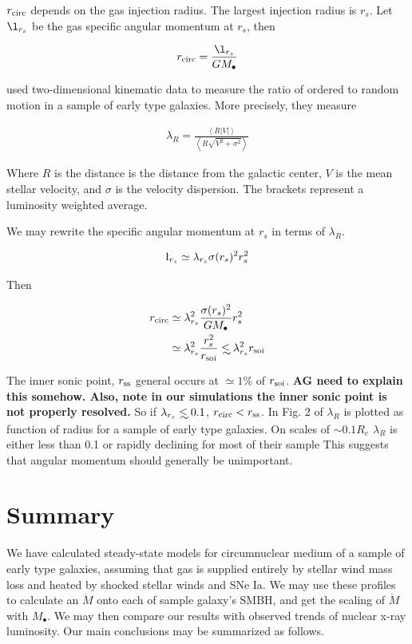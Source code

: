 \documentclass[usenatbib,fleqn]{mn2e}
\newcommand{\Mdot}{\dot{M}}
\newcommand\lsim{\mathrel{\rlap{\lower4pt\hbox{\hskip1pt$\sim$}}
    \raise1pt\hbox{$<$}}}
\newcommand{\rs}{r_s}
\newcommand{\rcirc}{r_{\rm circ}}
\newcommand{\rss}{r_{\rm ss}}
\newcommand{\lrs}{\l_{\rs}}
\newcommand{\lambdars}{\lambda_{\rs}}
\newcommand{\Mbh}[1][]{M_{\bullet#1}}
\newcommand{\soi}{\rm soi}
\newcommand{\rsoi}{r_{\soi}}
\begin{document}
  $\rcirc$ depends on the gas injection radius. The largest
  injection radius is $\rs$. Let $\lrs$ be the gas specific angular
  momentum at $\rs$, then 

  \begin{align}
    \rcirc=\frac{\lrs}{G \Mbh}
  \end{align}

  \citet{EmsellemCappellari+:2007a} used two-dimensional kinematic
  data to measure the ratio of ordered to random motion in a sample of
  early type galaxies. More precisely, they measure

  \begin{align}
    \lambda_R=\frac{\left<R|V|\right>}{\left<R\sqrt{V^2+\sigma^2}\right>}
  \end{align}

  Where $R$ is the distance is the distance from the galactic center, $V$ is
  the mean stellar velocity, and $\sigma$ is the velocity
  dispersion. The brackets represent a luminosity weighted average.

  We may rewrite the specific angular momentum at $\rs$ in terms of
  $\lambda_R$.

  \begin{align}
    \lrs\simeq\lambdars \sigma(\rs)^2 \rs^2
  \end{align}

  Then

  \begin{align}
    \rcirc&\simeq\lambdars^2 \frac{\sigma(\rs)^2}{G \Mbh} \rs^2\\
    &\simeq\lambdars^2 \frac{\rs^2}{\rsoi} \lsim \lambdars^2 \rsoi
  \end{align}

  The inner sonic point, $\rss$ general occurs at $\simeq 1\%$ of
  $\rsoi$. {\bf AG need to explain this somehow. Also, note in our
    simulations the inner sonic point is not properly resolved.}
  So if $\lambdars\lsim 0.1$, $\rcirc<\rss$. In Fig. 2 of
  \citet{EmsellemCappellari+:2007a} $\lambda_R$ is plotted as function
  of radius for a sample of early type galaxies. On scales of $\sim 0.1
  R_e$ $\lambda_R$ is either less than 0.1 or rapidly declining for most
  of their sample %
  This suggests that angular momentum should generally be unimportant.

  \section{Summary}
  \label{sec:summary}
  We have calculated steady-state models for circumnuclear medium of a
  sample of early type galaxies, assuming that gas is supplied
  entirely by stellar wind mass loss and heated by shocked stellar
  winds and SNe Ia. We may use these profiles to calculate an $\Mdot$
  onto each of sample galaxy's SMBH, and get the scaling of $\Mdot$
  with $\Mbh$. We may then compare our results with observed trends of
  nuclear x-ray luminosity. Our main conclusions may be summarized as
  follows.
\end{document}
